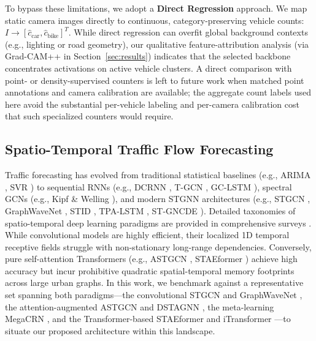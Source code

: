 \documentclass[a4paper,fleqn]{cas-sc}
\begin{document}
To bypass these limitations, we adopt a \textbf{Direct Regression} approach. We map static camera images directly to continuous, category-preserving vehicle counts: $I \to [\hat{c}_{\text{car}}, \hat{c}_{\text{bike}}]^T$. While direct regression can overfit global background contexts (e.g., lighting or road geometry), our qualitative feature-attribution analysis (via Grad-CAM++ in Section~\ref{sec:results}) indicates that the selected backbone concentrates activations on active vehicle clusters. A direct comparison with point- or density-supervised counters is left to future work when matched point annotations and camera calibration are available; the aggregate count labels used here avoid the substantial per-vehicle labeling and per-camera calibration cost that such specialized counters would require.

\subsection{Spatio-Temporal Traffic Flow Forecasting}
Traffic forecasting has evolved from traditional statistical baselines (e.g., ARIMA \cite{arima}, SVR \cite{svr}) to sequential RNNs (e.g., DCRNN \cite{dcrnn}, T-GCN \cite{tgcn}, GC-LSTM \cite{gclstm}), spectral GCNs (e.g., Kipf \& Welling \cite{gcn}), and modern STGNN architectures (e.g., STGCN \cite{stgcn}, GraphWaveNet \cite{wavenet}, STID \cite{stid}, TPA-LSTM \cite{tpalstm}, ST-GNCDE \cite{stgncde}). Detailed taxonomies of spatio-temporal deep learning paradigms are provided in comprehensive surveys \cite{yin_survey, gnn_survey}. While convolutional models are highly efficient, their localized 1D temporal receptive fields struggle with non-stationary long-range dependencies. Conversely, pure self-attention Transformers (e.g., ASTGCN \cite{astgcn}, STAEformer \cite{staeformer}) achieve high accuracy but incur prohibitive quadratic spatial-temporal memory footprints across large urban graphs. In this work, we benchmark against a representative set spanning both paradigms---the convolutional STGCN \cite{stgcn} and GraphWaveNet \cite{wavenet}, the attention-augmented ASTGCN \cite{astgcn} and DSTAGNN \cite{dstagnn}, the meta-learning MegaCRN \cite{megacrn}, and the Transformer-based STAEformer \cite{staeformer} and iTransformer \cite{itransformer}---to situate our proposed architecture within this landscape.
\end{document}
